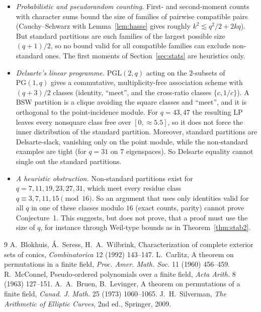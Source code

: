 \documentclass[11pt,a4paper]{article}
\theoremstyle{definition}
\theoremstyle{remark}
\newcommand{\PG}{\mathrm{PG}}
\newcommand{\PGL}{\mathrm{PGL}}
\begin{document}
\begin{itemize}
known arcs and the compatibility of the two pairs shows that $S$ is always even. So
the count gives no information.
\item \emph{Probabilistic and pseudorandom counting.} First- and second-moment counts with character sums bound
the size of families of pairwise compatible pairs (Cauchy--Schwarz with Lemma~\ref{lem:hasse} gives roughly
$k^2\lesssim q^2/2+2kq$). But standard partitions are such families of the largest possible size $(q+1)/2$, so no
bound valid for all compatible families can exclude non-standard ones. The first moments of
Section~\ref{sec:stats} are heuristics only.
\item \emph{Delsarte's linear programme.} $\PGL(2,q)$ acting on the $2$-subsets of $\PG(1,q)$ gives a commutative,
multiplicity-free association scheme with $(q+3)/2$ classes (identity, ``meet'', and the cross-ratio classes
$\{c,1/c\}$). A BSW partition is a clique avoiding the square classes and ``meet'', and it is orthogonal to the
point-incidence module. For $q=43,47$ the resulting LP leaves every nonsquare class free over $[0,\approx5.5]$, so it
does not force the inner distribution of the standard partition. Moreover,
standard partitions are Delsarte-slack, vanishing only on the point module, while the non-standard examples are
tight (for $q=31$ on $7$ eigenspaces). So Delsarte equality cannot single out the standard partitions.
\item \emph{A heuristic obstruction.} Non-standard partitions exist for $q=7,11,19,23,27,31$, which meet every
residue class $q\equiv3,7,11,15\pmod{16}$. So an argument that uses only identities valid for all $q$ in one of
these classes modulo $16$ (exact counts, parity) cannot prove Conjecture~1. This suggests, but does not prove, that a
proof must use the size of $q$, for instance through Weil-type bounds as in Theorem~\ref{thm:stab2}.
\end{itemize}

\begin{thebibliography}{9}
 A.~Blokhuis, \'A.~Seress, H.~A.~Wilbrink, Characterization of complete exterior sets of conics,
\emph{Combinatorica} 12 (1992) 143--147.
 L.~Carlitz, A theorem on permutations in a finite field, \emph{Proc. Amer. Math. Soc.} 11 (1960)
456--459.
 R.~McConnel, Pseudo-ordered polynomials over a finite field, \emph{Acta Arith.} 8 (1963) 127--151.
 A.~A.~Bruen, B.~Levinger, A theorem on permutations of a finite field, \emph{Canad. J. Math.} 25 (1973)
1060--1065.
 J.~H.~Silverman, \emph{The Arithmetic of Elliptic Curves}, 2nd ed., Springer, 2009.
\end{thebibliography}
\end{document}
